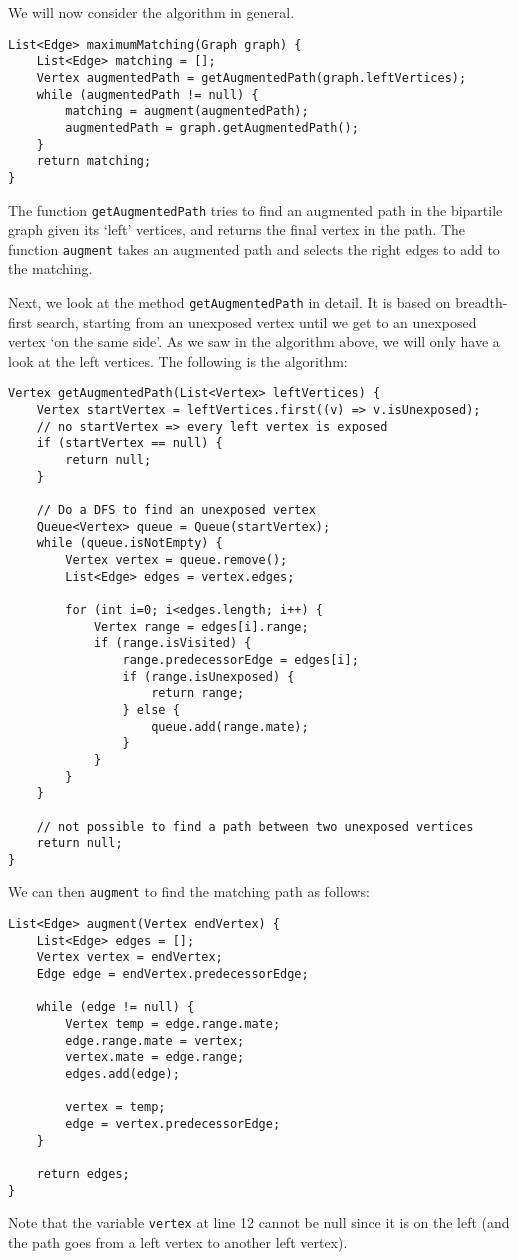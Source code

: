 \documentclass[a4paper, openany]{memoir}
\begin{document}
    We will now consider the algorithm in general.
\begin{lstlisting}[language=pseudocode]
List<Edge> maximumMatching(Graph graph) {
    List<Edge> matching = [];
    Vertex augmentedPath = getAugmentedPath(graph.leftVertices);
    while (augmentedPath != null) {
        matching = augment(augmentedPath);
        augmentedPath = graph.getAugmentedPath();
    }
    return matching;
}
\end{lstlisting}
    The function \texttt{getAugmentedPath} tries to find an augmented path in the bipartile graph given its `left' vertices, and returns the final vertex in the path. The function \texttt{augment} takes an augmented path and selects the right edges to add to the matching.

    Next, we look at the method \texttt{getAugmentedPath} in detail. It is based on breadth-first search, starting from an unexposed vertex until we get to an unexposed vertex `on the same side'. As we saw in the algorithm above, we will only have a look at the left vertices. The following is the algorithm:
\begin{lstlisting}[language=pseudocode]
Vertex getAugmentedPath(List<Vertex> leftVertices) {
    Vertex startVertex = leftVertices.first((v) => v.isUnexposed);
    // no startVertex => every left vertex is exposed 
    if (startVertex == null) {
        return null;
    }

    // Do a DFS to find an unexposed vertex
    Queue<Vertex> queue = Queue(startVertex);
    while (queue.isNotEmpty) {
        Vertex vertex = queue.remove();
        List<Edge> edges = vertex.edges;

        for (int i=0; i<edges.length; i++) {
            Vertex range = edges[i].range;
            if (range.isVisited) {
                range.predecessorEdge = edges[i];
                if (range.isUnexposed) {
                    return range;
                } else {
                    queue.add(range.mate);
                }
            }
        }
    }

    // not possible to find a path between two unexposed vertices
    return null;
}
\end{lstlisting}
    We can then \texttt{augment} to find the matching path as follows:
\begin{lstlisting}[language=pseudocode]
List<Edge> augment(Vertex endVertex) {
    List<Edge> edges = [];
    Vertex vertex = endVertex;
    Edge edge = endVertex.predecessorEdge;

    while (edge != null) {
        Vertex temp = edge.range.mate;
        edge.range.mate = vertex;
        vertex.mate = edge.range;
        edges.add(edge);

        vertex = temp;
        edge = vertex.predecessorEdge;
    }

    return edges;
}
\end{lstlisting}
    Note that the variable \texttt{vertex} at line 12 cannot be null since it is on the left (and the path goes from a left vertex to another left vertex).
\end{document}
